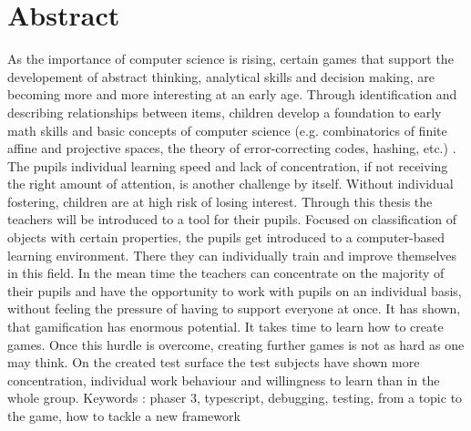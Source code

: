 
\chapter*{Abstract}

As the importance of computer science is rising, certain games that support the
developement of abstract thinking, analytical skills and decision making, are
becoming more and more interesting at an early age. Through identification and
describing relationships between items, children develop a foundation to early
math skills and basic concepts of computer science (e.g. combinatorics of finite
affine and projective spaces, the theory of error-correcting codes, hashing, etc.)
\cite{SET}. The pupils individual learning speed and lack of concentration, if
not receiving the right amount of attention, is another challenge by itself.
Without individual fostering, children are at high risk of losing interest.
Through this thesis the teachers will be introduced to a tool for their pupils.
Focused on classification of objects with certain properties, the pupils get
introduced to a computer-based learning environment. There they can individually
train and improve themselves in this field. In the mean time the teachers can
concentrate on the majority of their pupils and have the opportunity to work with
pupils on an individual basis, without feeling the pressure of having to support
everyone at once.
It has shown, that gamification has enormous potential. It takes time to learn how
to create games. Once this hurdle is overcome, creating further games is not as
hard as one may think. On the created test surface the test subjects have shown
more concentration, individual work behaviour and willingness to learn than in
the whole group.
Keywords : phaser 3, typescript, debugging, testing, from a topic to the game,  how to tackle a new framework
